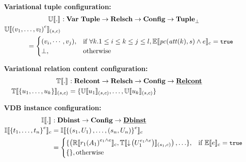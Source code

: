 \begin{figure}
\medskip
\textbf{Variational tuple configuration:}
%
\begin{alignat*}{1}%
\ouSemType [] . &: {\vartype \tupletype} \to \vRelSchSet \to \confSet \to \maybe \tupletype\\
%
\ouSem{\vRelSch} {\annot  {\left( {\vi v \numAtts}\right)}}  &\\
& \hspace{-50pt} = \begin{cases}
(v_i, \cdots, v_j), &\If \forall k. 1 \leq i \leq k \leq j \leq l, \fSem {\getPCfrom {\getAtt {k}} \vRelSch \wedge \dimMeta} = \t\\
\bot, &\Otherwise
\end{cases}
\end{alignat*}

\textbf{Variational relation content configuration:}
%
\begin{alignat*}{1}%
\otSemType [] . &: \vRelContSet \to \vRelSchSet \to \confSet \to \pRelContSet\\
%
\otSem {\vRelSch} {\setDef {\vi \tuple \numTuples}} &= \setDef {\ouSem {\vRelSch}{\tuple_1}, \hdots, \ouSem{\vRelSch} {\tuple_\numTuples}}
\end{alignat*}

\textbf{VDB instance configuration:}
%
\begin{alignat*}{1}%
\odbSem [] . &: \vdbInstSet \to \confSet \to \pInstSet\\
%
\odbSem { \annot  {\setDef {\vi \vTab \numRels}}} 
&=\odbSem { \annot  { \setDef {\left( \vRelSch_1, \vRelCont_1\right), \ldots, 
\left( \vRelSch_\numRels, \vRelCont_\numRels\right)}}}\\
& = \begin{cases}
\setDef{\left( \orSem {\vRel_1 \annot [\dimMeta_1 {\wedge \dimMeta}] {\left( \vAttList_1 \right)} }, 
\otSem {\vRelSch_1} {\pushIn {\annot [\dimMeta_1 {\wedge \dimMeta}] \vRelCont_1}} \right), \ldots}, &\If \fSem \dimMeta = \t \\
\setDef {}, \Otherwise
\end{cases}
\end{alignat*}


\end{figure}
